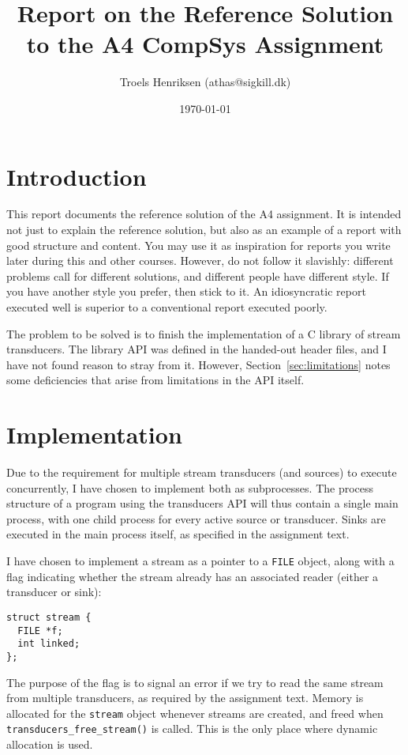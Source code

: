 \documentclass{article}
\title{Report on the Reference Solution to the A4 CompSys Assignment}
\author{Troels Henriksen (athas@sigkill.dk)}
\date{\today}
\begin{document}
\maketitle

\section{Introduction}

This report documents the reference solution of the A4 assignment.  It
is intended not just to explain the reference solution, but also as an
example of a report with good structure and content.  You may use it
as inspiration for reports you write later during this and other
courses.  However, do not follow it slavishly: different problems call
for different solutions, and different people have different style.
If you have another style you prefer, then stick to it.  An
idiosyncratic report executed well is superior to a conventional
report executed poorly.

The problem to be solved is to finish the implementation of a C
library of stream transducers.  The library API was defined in the
handed-out header files, and I have not found reason to stray from
it.  However, Section~\ref{sec:limitations} notes some deficiencies
that arise from limitations in the API itself.

\section{Implementation}

Due to the requirement for multiple stream transducers (and sources)
to execute concurrently, I have chosen to implement both as
subprocesses.  The process structure of a program using the
transducers API will thus contain a single main process, with one
child process for every active source or transducer.  Sinks are
executed in the main process itself, as specified in the assignment
text.

I have chosen to implement a stream as a pointer to a \texttt{FILE}
object, along with a flag indicating whether the stream already has an
associated reader (either a transducer or sink):

\begin{verbatim}
struct stream {
  FILE *f;
  int linked;
};
\end{verbatim}

The purpose of the flag is to signal an error if we try to read the
same stream from multiple transducers, as required by the assignment
text.  Memory is allocated for the \texttt{stream} object whenever
streams are created, and freed when \texttt{transducers\_free\_stream()}
is called.  This is the only place where dynamic allocation is used.
\end{document}
